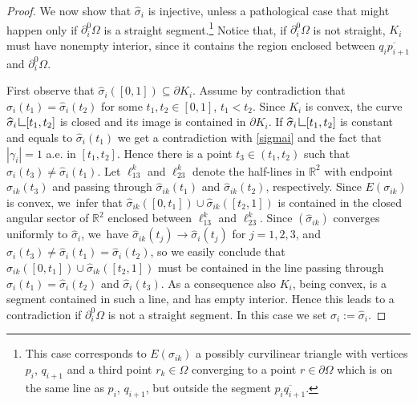 \documentclass[11pt]{article}
\numberwithin{equation}{section}
\newcommand{\R}{\mathbb{R}}
\let\Om\Omega
\newcommand{\resa}{\mathop{\hbox{\vrule height 7pt width 0.5pt depth 0pt
\vrule height 0.5pt width 6pt depth 0pt}}\nolimits}
\newcommand{\resb}{\mathop{\hbox{\vrule height 4pt width 0.5pt depth 0pt
\vrule height 0.5pt width 3pt depth 0pt}}\nolimits}
\newcommand{\res}{\mathchoice{\resa}{\resa}{\resb}{\resb}}
\theoremstyle{definition}
\begin{document}
\begin{proof}
We now show that $\widehat\sigma_i$ is injective, unless a pathological case that might happen only if $\partial_i^0\Om$
is a straight segment.\footnote{This case corresponds to $E(\sigma_{ik})$ a possibly curvilinear triangle with vertices $p_i$, $q_{i+1}$ and a third point $r_k\in \Om$ converging to a point $r\in \partial \Om$ which is on the same line as $p_i$, $q_{i+1}$, but outside the segment $\overline{p_iq_{i+1}}$.} Notice that, if $\partial_i^0\Om$ is not straight, $K_i$ must have nonempty interior, since it contains the region enclosed between $\overline {q_ip_{i+1}}$ and $\partial_i^0\Om$.

First observe that $\widehat\sigma_i([0,1])\subseteq \partial K_i$. Assume by contradiction that $\widehat\sigma_i(t_1)=\widehat\sigma_i(t_2)$ for some $t_1,t_2\in [0,1]$, $t_1<t_2$. Since $K_i$ is convex, the curve $\widehat\sigma_i\res [t_1,t_2]$ is closed and its image is contained in $\partial K_i$. If $\widehat\sigma_i\res [t_1,t_2]$ is constant and equals to $\widehat\sigma_i(t_1)$ we get a contradiction with \eqref{sigmai} and the fact that $|\gamma_i|=1$ a.e. in $[t_1,t_2]$. Hence there is a point $t_3\in(t_1,t_2)$ such that $\widehat\sigma_i(t_3)\neq \widehat\sigma_i(t_1)$. Let $\ell^k_{13}$ and $\ell^k_{23}$
denote the half-lines in $\R^2$ with endpoint ${\widehat\sigma_{ik}(t_3)}$ and passing through $\widehat\sigma_{ik}(t_1)$ and $\widehat\sigma_{ik}(t_2)$, respectively.
Since $E(\sigma_{ik})$ is convex, we~infer that $\widehat\sigma_{ik}([0,t_1])\cup \widehat\sigma_{ik}([t_2,1])$ is contained in the closed angular sector of $\R^2$ enclosed between $\ell^k_{13}$ and $\ell^k_{23}$.
Since $(\widehat\sigma_{ik})$ converges uniformly to $\widehat\sigma_i$, we~have
$\widehat\sigma_{ik}(t_j)\to \widehat\sigma_{i}(t_j)$ for $j=1,2,3$, and $\widehat\sigma_i(t_3)\neq \widehat\sigma_i(t_1)=\widehat\sigma_i(t_2)$, so we easily conclude that $\widehat\sigma_{ik}([0,t_1])\cup \widehat\sigma_{ik}([t_2,1])$ must be contained in the line passing through $ {\widehat\sigma_{i}(t_1)=\widehat\sigma_{i}(t_2)}$ and ${\widehat\sigma_{i}(t_3)}$. As a consequence also $K_i$, being convex, is a segment contained in such a line, and has empty interior. Hence this leads to a contradiction if $\partial_i^0\Om$ is not a straight segment. In this case we set $\sigma_i:=\widehat\sigma_i$.


\end{proof}
\end{document}
